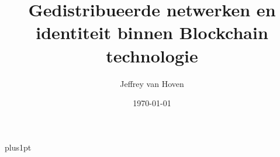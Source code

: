 \documentclass{Quintorthesis}
\begin{document}
  \baselineskip=15pt plus1pt
  \parskip=15pt
  \setcounter{secnumdepth}{2}
  \setcounter{tocdepth}{2}

  \renewcommand\appendixpagename{Bijlages}
  \renewcommand\appendixtocname{Bijlages}
  \newcommand{\hsp}{\hspace{10pt}}

  \titleformat{\chapter}[hang]{\Huge\bfseries}{\thechapter\hsp\textcolor{quintorred}{|}\hsp}{0pt}{\LARGE\bfseries}
  \titlespacing*{\chapter}{0pt}{0pt}{20pt}
  \titlespacing*{\paragraph}{0pt}{0pt}{10pt}

  \begin{titlepage}
    \title{Gedistribueerde netwerken en identiteit binnen Blockchain technologie}
    \author{Jeffrey van Hoven}
    \date{\today}
    \maketitle
  \end{titlepage}

  \begin{romanpages}
    
    \tableofcontents     
    \listoffigures              
    \listoftables
    \printnoidxglossary[title=Woordenlijst]
    \printnoidxglossary[title=Afkortingen, type=\acronymtype]
  \end{romanpages}

  
  
  
  
  
  
  
  
  
  
  
  


    
  \setlength\bibsep{\baselineskip}  
  

\end{document}
